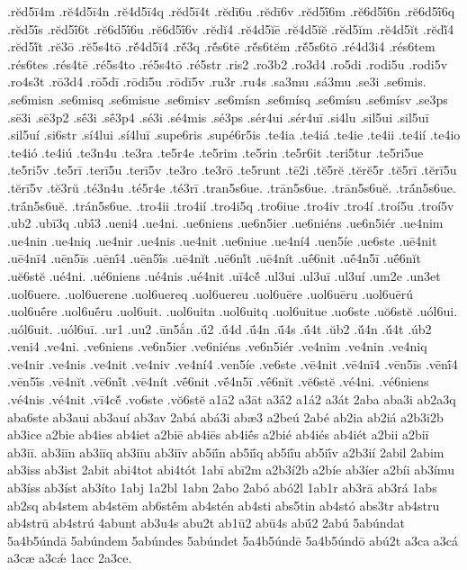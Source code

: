 {.rĕd5ī4m
.rĕ4d5ī4n
.rĕ4d5ī4q
.rĕd5ī4t
.rĕdī6u
.rĕdī6v
.rĕd5ī́6m
.rĕ6d5ī́6n
.rĕ6d5ī́6q
.rĕd5ī́s
.rĕd5ī́6t
.rĕ6d5ī́6u
.rĕ6d5ī́6v
.rĕdĭ4
.rĕ4d5ĭē
.rĕ4d5ĭĕ
.rĕd5ĭm
.rĕ4d5ĭt
.rĕdĭ́4
.rĕd5ĭ́t
.rĕ3ō
.rĕ5s4tō
.rĕ́4d5ĭ4
.rĕ́3q
.rĕ́s6tē
.rĕ́s6tĕm
.rĕ́5s6tō
.ré4d3i4
.rés6tem
.rés6tes
.rés4tē
.ré5s4to
.ré5s4tō
.ré5str
.ris2
.ro3b2
.ro3d4
.ro5di
.rodi5u
.rodi5v
.ro4s3t
.rō3d4
.rō5dī
.rōdī5u
.rōdī5v
.ru3r
.ru4s
.sa3mu
.sá3mu
.se3i
.se6mis.
.se6misn
.se6misq
.se6misue
.se6misv
.se6mísn
.se6mísq
.se6mísu
.se6mísv
.se3ps
.sē3i
.sē3p2
.sḗ3i
.sḗ3p4
.sé3i
.sé4mis
.sé3ps
.sér4ui
.sér4uī
.si4lu
.sil5ui
.sil5uī
.sil5uí
.si6str
.sí4lui
.sí4luī
.supe6ris
.supé6r5is
.te4ia
.te4iá
.te4ie
.te4ii
.te4ií
.te4io
.te4ió
.te4iú
.te3n4u
.te3ra
.te5r4e
.te5rim
.te5rin
.te5r6it
.teri5tur
.te5ri5ue
.te5ri5v
.te5rī
.terī5u
.terī5v
.te3ro
.te3rō
.te5runt
.tē2i
.tĕ5rĕ
.tĕrĕ5r
.tĕ5rī
.tĕrī5u
.tĕrī5v
.tĕ3rŭ
.té3n4u
.té5r4e
.té3rī
.tran5s6ue.
.trān5s6ue.
.trān5s6uĕ.
.trā́n5s6ue.
.trā́n5s6uĕ.
.trán5s6ue.
.tro4ii
.tro4ií
.tro4i5q
.tro6iue
.tro4iv
.tro4í
.troí5u
.troí5v
.ub2
.ubī3q
.ubī́3
.ueni4
.ue4ni.
.ue6niens
.ue6n5ier
.ue6niéns
.ue6n5iér
.ue4nim
.ue4nin
.ue4niq
.ue4nir
.ue4nis
.ue4nit
.ue6niue
.ue4ní4
.uen5íe
.ue6ste
.uē4nit
.uē4nī4
.uēn5īs
.uēnī́4
.uēn5ī́s
.uē4nĭt
.uē6nĭ́t
.uē4nít
.uḗ6nit
.uḗ4n5ī
.uḗ6nĭt
.uĕ6stĕ
.ué4ni.
.ué6niens
.ué4nis
.ué4nit
.uī4cĕ́
.ul3ui
.ul3uī
.ul3uí
.um2e
.un3et
.uol6uere.
.uol6uerene
.uol6uereq
.uol6uereu
.uol6uēre
.uol6uēru
.uol6uērú
.uol6uḗre
.uol6uḗru
.uol6uit.
.uol6uitn
.uol6uitq
.uol6uitue
.uo6ste
.uŏ6stĕ
.uól6ui.
.uól6uit.
.uól6uī.
.ur1
.uu2
.ūn5ắn
.ū́2
.ū́4d
.ū́4n
.ū́4s
.ū́4t
.ŭb2
.ŭ́4n
.ŭ́4t
.úb2
.veni4
.ve4ni.
.ve6niens
.ve6n5ier
.ve6niéns
.ve6n5iér
.ve4nim
.ve4nin
.ve4niq
.ve4nir
.ve4nis
.ve4nit
.ve4niv
.ve4ní4
.ven5íe
.ve6ste
.vē4nit
.vē4nī4
.vēn5īs
.vēnī́4
.vēn5ī́s
.vē4nĭt
.vē6nĭ́t
.vē4nít
.vḗ6nit
.vḗ4n5ī
.vḗ6nĭt
.vĕ6stĕ
.vé4ni.
.vé6niens
.vé4nis
.vé4nit
.vī4cĕ́
.vo6ste
.vŏ6stĕ
a1ā2
a3āt
a3ā́2
a1á2
a3át
2aba
aba3i
ab2a3q
aba6ste
ab3aui
ab3auí
ab3av
2abá
abá3i
abæ3
a2beú
2abé
ab2ia
ab2iá
a2b3i2b
ab3ice
a2bie
ab4ies
ab4iet
a2biē
ab4iēs
ab4iḗs
a2bié
ab4iés
ab4iét
a2bii
a2biī
ab3iī.
ab3iīn
ab3iīq
ab3iīu
ab3iīv
ab5iī́n
ab5iī́q
ab5iī́u
ab5iī́v
a2b3ií
2abil
2abim
ab3iss
ab3ist
2abit
abi4tot
abi4tót
1abī
abī2m
a2b3í2b
a2bíe
ab3íer
a2bíi
ab3ímu
ab3íss
ab3íst
ab3íto
1abj
1a2bl
1abn
2abo
2abó
abó2l
1ab1r
ab3rā
ab3rá
1abs
ab2sq
ab4stem
ab4stēm
ab6stḗm
ab4stén
ab4sti
abs5tin
ab4stó
abs3tr
ab4stru
ab4strū
ab4strú
4abunt
ab3u4s
abu2t
ab1ū2
abū4s
abū́2
2abú
5abúndat
5a4b5úndā
5abúndem
5abúndes
5abúndet
5a4b5úndē
5a4b5úndō
abú2t
a3ca
a3cá
a3cæ
a3cǽ
1acc
2a3ce.
}
